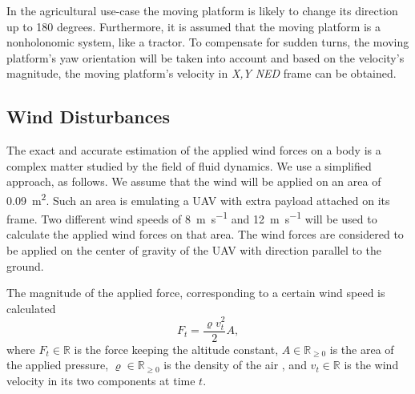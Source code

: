 \documentclass[conference]{IEEEtran}
\begin{document}

In the agricultural use-case the moving platform is likely to change
its direction up to 180 degrees. Furthermore, it is assumed that the
moving platform is a nonholonomic system, like a tractor. To
compensate for sudden turns, the moving platform's yaw orientation
will be taken into account and based on the velocity's magnitude, the
moving platform's velocity in \emph{X,Y} \emph{NED} frame can be obtained.





\subsection{Wind Disturbances}
\label{sec:WindDisturbances}

The exact and accurate estimation of the applied wind forces on a body
is a complex matter studied by the field of fluid dynamics. We use a
simplified approach, as follows. We assume that the wind will be
applied on an area of \SI{0.09}{\m^2}. Such an area is emulating a UAV
with extra payload attached on its frame. Two different wind speeds of
\SI{8}{\m \per \s} and \SI{12}{\m \per \s} will be used to calculate the applied wind forces
on that area. The wind forces are considered to be applied on the
center of gravity of the UAV with direction parallel to the ground.

The magnitude of the applied force, corresponding to a certain wind
speed is calculated~\cite{anderson2010fundamentals}
\begin{equation}
F_t = \frac{\varrho  v_t^2}{2}   A,
\end{equation}
where $F_t\in\mathbb{R}$ is the force keeping the altitude constant, 
\(A\in\mathbb{R}_{\geq 0}\) is the area of the applied pressure, \(\varrho\in\mathbb{R}_{\geq 0}\) is the density of the
air %
, and \(v_t\in\mathbb{R}\) is the wind velocity in its two components at time $t$. %
\end{document}
